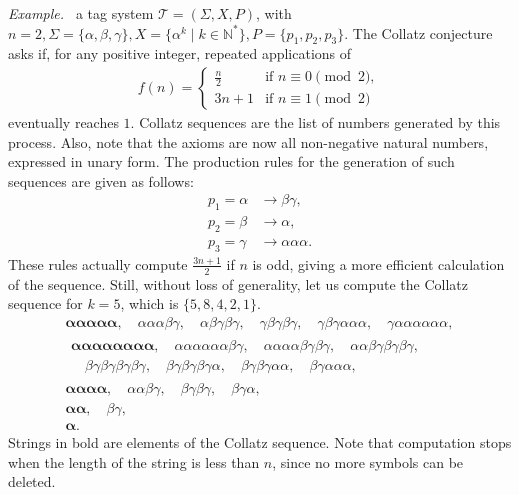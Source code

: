 \documentclass[12pt]{article}
\begin{document}
\emph{Example.~\cite[Theorem 2.1]{DeMol:article:2008:nov}} a tag system
$\mathcal{T} = (\Sigma, X, P)$, with $n = 2, \Sigma = \{\alpha, \beta,
\gamma\}, X = \{\alpha^{k} \mid k \in \mathbb{N}^{*}\}, P = \{p_{1}, p_{2},
p_{3}\}$. The Collatz conjecture asks if, for any positive integer, repeated
applications of
\begin{align}
    f(n) =
    \begin{cases}
        \frac{n}{2} & \text{if } n \equiv 0 \pmod{2}, \\
        3n + 1      & \text{if } n \equiv 1 \pmod{2}
    \end{cases}
\end{align}
eventually reaches $1$. Collatz sequences are the list of numbers generated by
this process. Also, note that the axioms are now all non-negative natural
numbers, expressed in unary form. The production rules for the generation of
such sequences are given as follows:
\begin{align}
    p_{1} = \alpha &\rightarrow \beta\gamma,        \\
    p_{2} = \beta  &\rightarrow \alpha,             \\
    p_{3} = \gamma &\rightarrow \alpha\alpha\alpha.
\end{align}
These rules actually compute $\frac{3n + 1}{2}$ if $n$ is odd, giving a more
efficient calculation of the sequence. Still, without loss of generality, let
us compute the Collatz sequence for $k = 5$, which is $\{5, 8, 4, 2, 1\}$.
\begin{align}
    \boldsymbol{\alpha\alpha\alpha\alpha\alpha},
        \quad \alpha\alpha\alpha\beta\gamma,
        \quad \alpha\beta\gamma\beta\gamma,
        \quad \gamma\beta\gamma\beta\gamma,
        \quad \gamma\beta\gamma\alpha\alpha\alpha,
        \quad \gamma\alpha\alpha\alpha\alpha\alpha\alpha, \\
    \begin{split}
        \boldsymbol{\alpha\alpha\alpha\alpha\alpha\alpha\alpha\alpha},
            \quad \alpha\alpha\alpha\alpha\alpha\alpha\beta\gamma,
            \quad \alpha\alpha\alpha\alpha\beta\gamma\beta\gamma,
            \quad \alpha\alpha\beta\gamma\beta\gamma\beta\gamma, \\
            \quad \beta\gamma\beta\gamma\beta\gamma\beta\gamma,
            \quad \beta\gamma\beta\gamma\beta\gamma\alpha,
            \quad \beta\gamma\beta\gamma\alpha\alpha,
            \quad \beta\gamma\alpha\alpha\alpha, &
    \end{split} \\
    \boldsymbol{\alpha\alpha\alpha\alpha},
        \quad \alpha\alpha\beta\gamma,
        \quad \beta\gamma\beta\gamma,
        \quad \beta\gamma\alpha, \\
    \boldsymbol{\alpha\alpha},
        \quad \beta\gamma, \\
    \boldsymbol{\alpha}.
\end{align}
Strings in bold are elements of the Collatz sequence. Note that computation
stops when the length of the string is less than $n$, since no more symbols can
be deleted.
\end{document}
